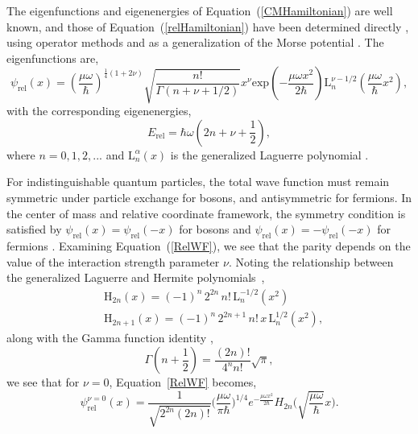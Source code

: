 \documentclass[preprints,article,accept,moreauthors,pdftex]{Definitions/mdpi}
\begin{document}
The eigenfunctions and eigenenergies of Equation~(\ref{CMHamiltonian}) are well known, and those of Equation~(\ref{relHamiltonian}) have been determined directly \cite{Calogero1969, Weissman1979}, using operator methods \cite{Ballhausen1988} and as a generalization of the Morse potential \cite{Nogueira2016}. The eigenfunctions are,
\begin{equation}
	\label{RelWF}
	\psi_{\mathrm{rel}}(x) = \left(\frac{\mu \omega}{\hbar}\right)^{\frac{1}{4}(1+2\nu)}\sqrt{\frac{n!}{\Gamma(n+\nu+1/2)}}x^{\nu}\mathrm{exp}\left(-\frac{\mu \omega x^2}{2 \hbar}\right) \mathrm{L}_n^{\nu-1/2}\left(\frac{\mu \omega}{\hbar}x^2\right),
\end{equation}
with the corresponding eigenenergies,
\begin{equation}
	\label{relEnergy}
	E_{\mathrm{rel}} = \hbar \omega \left(2n+\nu+\frac{1}{2}\right),
\end{equation}
where $n = 0,1,2,...$ and $\mathrm{L}_n^{\alpha}(x)$ is the generalized Laguerre polynomial \cite{AbramowitzBook}. 

For indistinguishable quantum particles, the total wave function must remain symmetric under particle exchange for bosons, and antisymmetric for fermions. In the center of mass and relative coordinate framework, the symmetry condition is satisfied by $\psi_{\mathrm{rel}}(x) = \psi_{\mathrm{rel}}(-x)$ for bosons and $\psi_{\mathrm{rel}}(x) = -\psi_{\mathrm{rel}}(-x)$ for fermions \cite{Sutherland1988}. Examining \mbox{Equation (\ref{RelWF})}, we see that the parity depends on the value of the interaction strength parameter $\nu$. Noting the relationship between the generalized Laguerre and Hermite \mbox{polynomials~\cite{Szego1939}},
\begin{equation}
	\begin{split}
	&\mathrm{H}_{2n}(x) = (-1)^n \, 2^{2n} \, n! \, \mathrm{L}_n^{-1/2}(x^2) \\
	&\mathrm{H}_{2n+1}(x) = (-1)^n \, 2^{2n+1} \, n! \, x \, \mathrm{L}_n^{1/2}(x^2), 
	\end{split}
\end{equation}
along with the Gamma function identity \cite{AbramowitzBook},
\begin{equation}
	\Gamma\left(n+\frac{1}{2}\right) = \frac{(2n)!}{4^n n!}\sqrt{\pi},
\end{equation}
we see that for $\nu = 0$, Equation~\eqref{RelWF} becomes, 
\begin{equation}
	\label{relBoson}
	\psi_{\mathrm{rel}}^{\nu = 0}(x)=\frac{1}{\sqrt{2^{2n} (2n)!}} \bigg(\frac{\mu \omega}{\pi \hbar} \bigg)^{1/4} e^{- \frac{\mu \omega x^2}{2 \hbar}} H_{2n} \bigg( \sqrt{\frac{\mu \omega}{\hbar}}x\bigg).
\end{equation}
\end{document}
